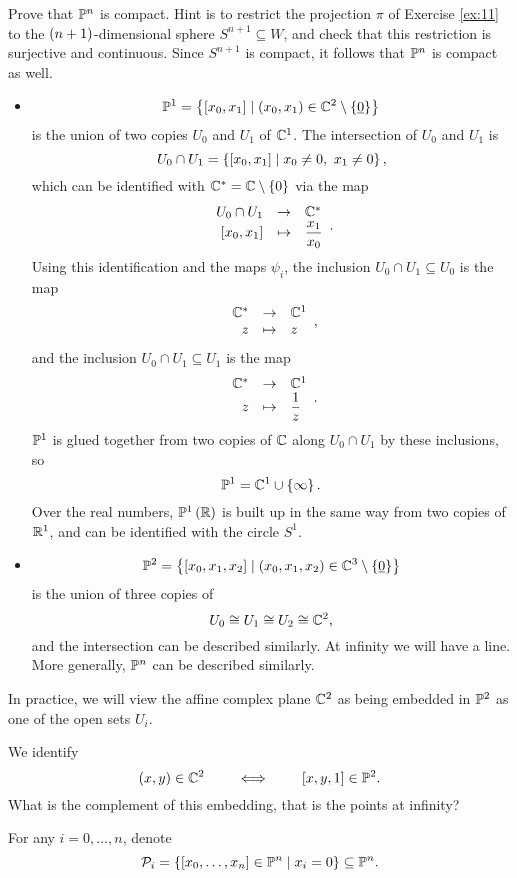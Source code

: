\begin{exercise}
\label{ex:12}
Prove that $ \P^n $ is compact. Hint is to restrict the projection $ \pi $ of Exercise \ref{ex:11} to the $ \rb{n + 1} $-dimensional sphere $ S^{n + 1} \subseteq W $, and check that this restriction is surjective and continuous. Since $ S^{n + 1} $ is compact, it follows that $ \P^n $ is compact as well.
\end{exercise}

\begin{example}
\hfill
\begin{itemize}
\item
$$ \P^1 = \cb{\sb{x_0, x_1} \mid \rb{x_0, x_1} \in \C^2 \setminus \cb{\underline{0}}} $$
is the union of two copies $ U_0 $ and $ U_1 $ of $ \C^1 $. The intersection of $ U_0 $ and $ U_1 $ is
$$ U_0 \cap U_1 = \cb{\sb{x_0, x_1} \mid x_0 \ne 0, \ x_1 \ne 0}, $$
which can be identified with $ \C^* = \C \setminus \cb{0} $ via the map
$$ \function{U_0 \cap U_1}{\C^*}{\sb{x_0, x_1}}{\dfrac{x_1}{x_0}}. $$
Using this identification and the maps $ \psi_i $, the inclusion $ U_0 \cap U_1 \subseteq U_0 $ is the map
$$ \function{\C^*}{\C^1}{z}{z}, $$
and the inclusion $ U_0 \cap U_1 \subseteq U_1 $ is the map
$$ \function{\C^*}{\C^1}{z}{\dfrac{1}{z}}. $$
$ \P^1 $ is glued together from two copies of $ \C $ along $ U_0 \cap U_1 $ by these inclusions, so
$$ \P^1 = \C^1 \cup \cb{\infty}. $$
Over the real numbers, $ \P^1\rb{\R} $ is built up in the same way from two copies of $ \R^1 $, and can be identified with the circle $ S^1 $.
\item
$$ \P^2 = \cb{\sb{x_0, x_1, x_2} \mid \rb{x_0, x_1, x_2} \in \C^3 \setminus \cb{\underline{0}}} $$
is the union of three copies of
$$ U_0 \cong U_1 \cong U_2 \cong \C^2, $$
and the intersection can be described similarly. At infinity we will have a line. More generally, $ \P^n $ can be described similarly.
\end{itemize}
\end{example}

In practice, we will view the affine complex plane $ \C^2 $ as being embedded in $ \P^2 $ as one of the open sets $ U_i $.

\begin{example*}
We identify
$$ \rb{x, y} \in \C^2 \qquad \iff \qquad \sb{x, y, 1} \in \P^2. $$
What is the complement of this embedding, that is the points at infinity?
\end{example*}

\begin{notation}
For any $ i = 0, \dots, n $, denote
$$ \PP_i = \cb{\sb{x_0, \dots, x_n} \in \P^n \mid x_i = 0} \subseteq \P^n. $$
\end{notation}

